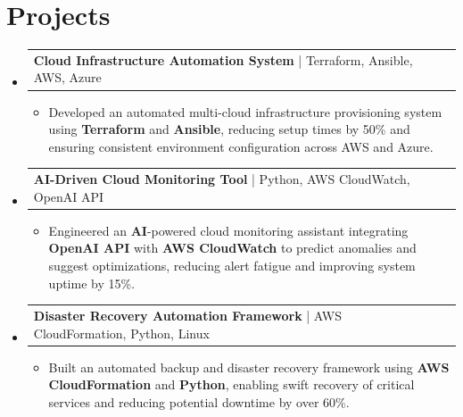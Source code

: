\documentclass[letterpaper,10pt]{article}
\makeatletter
\newcommand{\resumeItem}[1]{
  \item{\fontsize{8pt}{9pt}\selectfont
    #1 \vspace{-3pt}
  }
}
\newcommand{\resumeProjectHeading}[2]{
    \item
    \begin{tabular*}{1.001\textwidth}{l@{\extracolsep{\fill}}r}
      \fontsize{8.5pt}{10pt}#1 & \textbf{\fontsize{8.5pt}{10pt} #2}\\
    \end{tabular*}\vspace{-7pt}
}
\newcommand{\resumeSubHeadingListStart}{\begin{itemize}[leftmargin=0pt, label={}]}
\newcommand{\resumeSubHeadingListEnd}{\end{itemize}}
\newcommand{\resumeItemListStart}{\begin{itemize}[leftmargin=*]}
\newcommand{\resumeItemListEnd}{\end{itemize}\vspace{-5pt}}
\makeatother
\begin{document}
\section{Projects}
    \vspace{-5pt}
    \resumeSubHeadingListStart
          \resumeProjectHeading
            {\textbf{Cloud Infrastructure Automation System} | Terraform, Ansible, AWS, Azure}
            {}
            \resumeItemListStart
                \resumeItem{Developed an automated multi-cloud infrastructure provisioning system using \textbf{Terraform} and \textbf{Ansible}, reducing setup times by 50\% and ensuring consistent environment configuration across AWS and Azure.}
            \resumeItemListEnd
        \vspace{-12pt}
    
        \resumeProjectHeading
            {\textbf{AI-Driven Cloud Monitoring Tool} | Python, AWS CloudWatch, OpenAI API}
            {}
            \resumeItemListStart
                \resumeItem{Engineered an \textbf{AI}-powered cloud monitoring assistant integrating \textbf{OpenAI API} with \textbf{AWS CloudWatch} to predict anomalies and suggest optimizations, reducing alert fatigue and improving system uptime by 15\%.}
            \resumeItemListEnd
      \vspace{-12pt}
      \resumeProjectHeading
        {\textbf{Disaster Recovery Automation Framework} | AWS CloudFormation, Python, Linux}
        {}
        \resumeItemListStart
            \resumeItem{Built an automated backup and disaster recovery framework using \textbf{AWS CloudFormation} and \textbf{Python}, enabling swift recovery of critical services and reducing potential downtime by over 60\%.}
        \resumeItemListEnd
    \resumeSubHeadingListEnd
\end{document}
